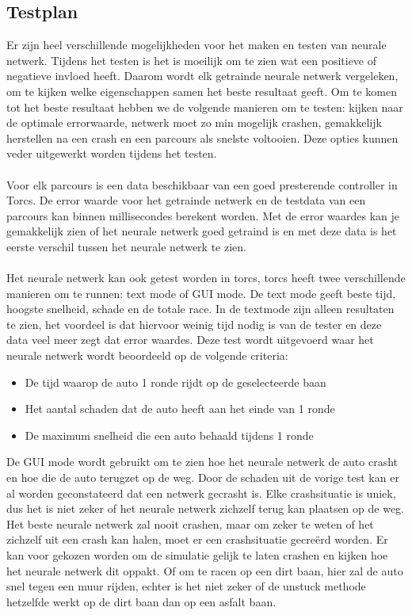 \pagebreak
\subsection{Testplan}
\label{testplan}
Er zijn heel verschillende mogelijkheden voor het maken en testen van neurale netwerk. Tijdens het testen is het is moeilijk om te zien wat een positieve of negatieve invloed heeft. Daarom wordt elk getrainde neurale netwerk vergeleken, om te kijken welke eigenschappen samen het beste resultaat geeft. Om te komen tot het beste resultaat hebben we de volgende manieren om te testen: kijken naar de optimale errorwaarde, netwerk moet zo min mogelijk crashen, gemakkelijk herstellen na een crash en een parcours als snelste voltooien. Deze opties kunnen veder uitgewerkt worden tijdens het testen. \\\\
Voor elk parcours is een data beschikbaar van een goed presterende controller in Torcs. De error waarde voor het getrainde netwerk en de testdata van een parcours kan binnen millisecondes berekent worden. Met de error waardes kan je gemakkelijk zien of het neurale netwerk goed getraind is en met deze data is het eerste verschil tussen het neurale netwerk te zien. \\\\
Het neurale netwerk kan ook getest worden in torcs, torcs heeft twee verschillende manieren om te runnen: text mode of GUI mode. De text mode geeft beste tijd, hoogste snelheid, schade en de totale race. In de textmode zijn alleen resultaten te zien, het voordeel is dat hiervoor weinig tijd nodig is van de tester en deze data veel meer zegt dat error waardes. Deze test wordt uitgevoerd waar het neurale netwerk wordt beoordeeld op de volgende criteria:
\begin{itemize}
\item De tijd waarop de auto 1 ronde rijdt op de geselecteerde baan
\item Het aantal schaden dat de auto heeft aan het einde van 1 ronde
\item De maximum snelheid die een auto behaald tijdens 1 ronde
\end{itemize}
\noindent De GUI mode wordt gebruikt om te zien hoe het neurale netwerk de auto crasht en hoe die de auto terugzet op de weg. Door de schaden uit de vorige test kan er al worden geconstateerd dat een netwerk gecrasht is. Elke crashsituatie is uniek, dus het is niet zeker of het neurale netwerk zichzelf terug kan plaatsen op de weg. Het beste neurale netwerk zal nooit crashen, maar om zeker te weten of het zichzelf uit een crash kan halen, moet er een crashsituatie gecre\"erd worden. Er kan voor gekozen worden om de simulatie gelijk te laten crashen en kijken hoe het neurale netwerk dit oppakt. Of om te racen op een dirt baan, hier zal de auto snel tegen een muur rijden, echter is het niet zeker of de unstuck methode hetzelfde werkt op de dirt baan dan op een asfalt baan.\\\\
